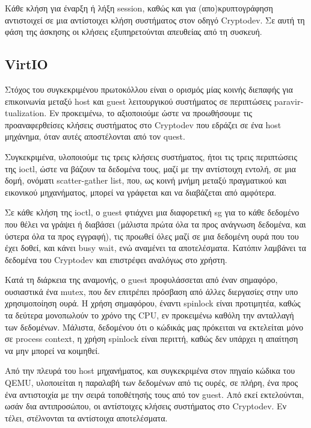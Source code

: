 \documentclass[12pt,titlepage]{article}
\newcommand{\en}{\textlatin}
\begin{document}
Κάθε κλήση για έναρξη ή λήξη \en{session}, καθώς και για (απο)κρυπτογράφηση αντιστοιχεί σε μια αντίστοιχει κλήση συστήματος στον οδηγό \en{Cryptodev}. Σε αυτή τη φάση της άσκησης οι κλήσεις εξυπηρετούνται απευθείας από τη συσκευή.

\subsection{\en{VirtIO}}

Στόχος του συγκεκριμένου πρωτοκόλλου είναι ο ορισμός μίας κοινής διεπαφής για επικοινωνία μεταξύ \en{host} και \en{guest} λειτουργικού συστήματος σε περιπτώσεις \en{paravirtualization}. Εν προκειμένω, το αξιοποιούμε ώστε να προωθήσουμε τις προαναφερθείσες κλήσεις συστήματος στο \en{Cryptodev} που εδράζει σε ένα \en{host} μηχάνημα, όταν αυτές αποστέλονται από τον \en{quest}.

Συγκεκριμένα, υλοποιούμε τις τρεις κλήσεις συστήματος, ήτοι τις τρεις περιπτώσεις της \en{ioctl}, ώστε να βάζουν τα δεδομένα τους, μαζί με την αντίστοιχη εντολή, σε μια δομή, ονόματι \en{scatter-gather list}, που, ως κοινή μνήμη μεταξύ πραγματικού και εικονικού μηχανήματος, μπορεί να γράφεται και να διαβάζεται από αμφότερα.

Σε κάθε κλήση της \en{ioctl}, ο \en{guest} φτιάχνει μια διαφορετική \en{sg} για το κάθε δεδομένο που θέλει να γράψει ή διαβάσει (μάλιστα πρώτα όλα τα προς ανάγνωση δεδομένα, και ύστερα όλα τα προς εγγραφή), τις προωθεί όλες μαζί σε μια δεδομένη ουρά που του έχει δοθεί, και κάνει \en{busy wait}, ενώ αναμένει τα αποτελέσματα. Κατόπιν λαμβάνει τα δεδομένα του \en{Cryptodev} και επιστρέφει αναλόγως στο χρήστη.

Κατά τη διάρκεια της αναμονής, ο \en{guest} προφυλάσσεται από έναν σημαφόρο, ουσιαστικά ένα \en{mutex}, που δεν επιτρέπει πρόσβαση από άλλες διεργασίες στην υπο χρησιμοποίηση ουρά. Η χρήση σημαφόρου, έναντι \en{spinlock} είναι προτιμητέα, καθώς τα δεύτερα μονοπωλούν το χρόνο της \en{CPU}, εν προκειμένω καθόλη την ανταλλαγή των δεδομένων. Μάλιστα, δεδομένου ότι ο κώδικάς μας πρόκειται να εκτελείται μόνο σε \en{process context}, η χρήση \en{spinlock} είναι περιττή, καθώς δεν υπάρχει η απαίτηση να μην μπορεί να κοιμηθεί.

Από την πλευρά του \en{host} μηχανήματος, και συγκεκριμένα στον πηγαίο κώδικα του \en{QEMU}, υλοποιείται η παραλαβή των δεδομένων από τις ουρές, σε πλήρη, ένα προς ένα αντιστοιχία με την σειρά τοποθέτησής τους από τον \en{guest}. Από εκεί εκτελούνται, ωσάν δια αντιπροσώπου, οι αντίστοιχες κλήσεις συστήματος στο \en{Cryptodev}. Εν τέλει, στέλνονται τα αντίστοιχα αποτελέσματα.
\end{document}
